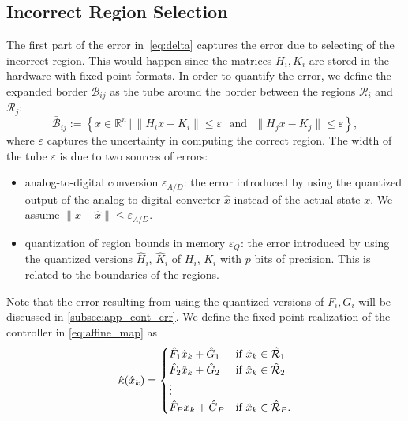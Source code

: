  \subsection{Incorrect Region Selection}
 	The first part of the error in~\autoref{eq:delta} captures the error due to
 	selecting of the incorrect region.
 	This would happen since the matrices $H_i,K_i$ are stored in the hardware with fixed-point formats. In order to quantify the error, we define the expanded border $\bar{\mathcal B}_{ij}$ as the tube around the border between the regions $\mathcal{R}_i$ and $\mathcal{R}_j$:
 	\begin{equation*}
 	\bar{\mathcal B}_{ij} := \left\{x\in\mathbb R^n\,|\, \| H_i x - K_i\| \le \varepsilon\,\, \text{ and }\,\, \| H_j x - K_j\| \le \varepsilon \right\},
 	\end{equation*}
 	where $\varepsilon$ captures the uncertainty in computing the correct region.
 	The width of the tube $\varepsilon$ is due to two sources of errors:
 	\begin{itemize}
 		\item analog-to-digital conversion $\varepsilon_{A/D}$: 
		the error introduced by using the quantized output of the analog-to-digital converter $\hat x$ instead of the actual state $x$. 
		We assume $\|x - \hat x\|\le \varepsilon_{A/D}$.
 		\item quantization of region bounds in memory $\varepsilon_{Q}$: the error introduced by 
		using the quantized versions $\hat H_i$, $\hat K_i$ of $H_i$, $K_i$ with $p$ bits of precision. 
		This is related to the boundaries of the regions.
 	\end{itemize}
 	Note that the error resulting from using the quantized versions of $F_i,G_i$ will be discussed in \autoref{subsec:app_cont_err}.
 	We define the fixed point realization of the controller in \autoref{eq:affine_map} as
 	 	\begin{equation}
 	 	\label{eq:affine_map_hat}
 	 	\hat\kappa(\hat x_k)=
 	 	\begin{cases}
 	 	\hat F_1\hat x_k+\hat G_1 & \text{if $\hat x_k\in \mathcal{\hat R}_1$}\\
 	 	\hat F_2\hat x_k+\hat G_2 & \text{if $\hat x_k\in \mathcal{\hat R}_2$}\\
 	 	\vdots\\
 	 	\hat F_P x_k+\hat G_P & \text{if $ \hat x_k\in \mathcal{\hat R}_P$}.
 	 	\end{cases} 
 	 	\end{equation}
